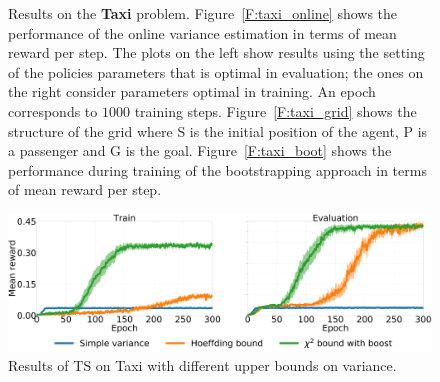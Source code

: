 \begin{figure}[t]
\begin{minipage}{.33\textwidth}
\begin{center}
\end{center}
\end{minipage}
\caption[Taxi results]{Results on the \textbf{Taxi} problem. Figure~\ref{F:taxi_online} shows the performance of the online variance estimation in terms of mean reward per step. The plots on the left show results using the setting of the policies parameters that is optimal in evaluation; the ones on the right consider parameters optimal in training. An epoch corresponds to $1000$ training steps. Figure~\ref{F:taxi_grid} shows the structure of the grid where S is the initial position of the agent, P is a passenger and G is the goal. Figure~\ref{F:taxi_boot} shows the performance during training of the bootstrapping approach in terms of mean reward per step.}\label{F:taxi}
\end{figure}
\begin{figure}[t]
\begin{minipage}{\textwidth}
\begin{center}
  \includegraphics[scale=.05]{img/bounds.pdf}
\end{center}
\end{minipage}
\caption[Taxi with different upper bounds results - 1]{Results of TS on Taxi with different upper bounds on variance.}\label{F:bounds}
\end{figure}
